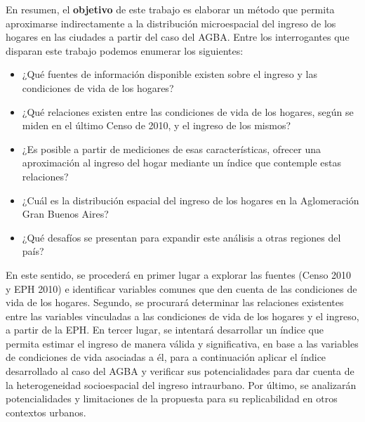 En resumen, el \textbf{objetivo} de este trabajo es elaborar un método que permita aproximarse indirectamente a la distribución microespacial del ingreso de los hogares en las ciudades a partir del caso del AGBA. Entre los interrogantes que disparan este trabajo podemos enumerar los siguientes: 

\begin{itemize}
	\item ¿Qué fuentes de información disponible existen sobre el ingreso y las condiciones de vida de los hogares?
	\item ¿Qué relaciones existen entre las condiciones de vida de los hogares, según se miden en el último Censo de 2010, y el ingreso de los mismos?
	\item ¿Es posible a partir de mediciones de esas características, ofrecer una aproximación al ingreso del hogar mediante un índice que contemple estas relaciones?
	\item ¿Cuál es la distribución espacial del ingreso de los hogares en la Aglomeración Gran Buenos Aires?
	\item ¿Qué desafíos se presentan para expandir este análisis a otras regiones del país?
\end{itemize}

En este sentido, se procederá en primer lugar a explorar las fuentes (Censo 2010 y EPH 2010) e identificar variables comunes que den cuenta de las condiciones de vida de los hogares. Segundo, se procurará determinar las relaciones existentes entre las variables vinculadas a las condiciones de vida de los hogares y el ingreso, a partir de la EPH. En tercer lugar, se intentará desarrollar un índice que permita estimar el ingreso de manera válida y significativa, en base a las variables de condiciones de vida asociadas a él, para a continuación aplicar el índice desarrollado al caso del AGBA y verificar sus potencialidades para dar cuenta de la heterogeneidad socioespacial del ingreso intraurbano. Por último, se analizarán potencialidades y limitaciones de la propuesta para su replicabilidad en otros contextos urbanos.

